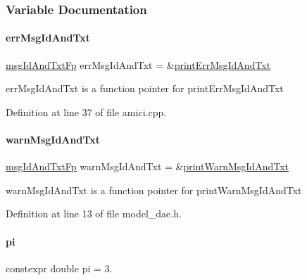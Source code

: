 \subsubsection{Variable Documentation}
\mbox{\label{namespaceamici_a19eefc037cc960b013cc0b724e5292b7}} 
\paragraph{\texorpdfstring{err\+Msg\+Id\+And\+Txt}{errMsgIdAndTxt}}
{\footnotesize\ttfamily \mbox{\hyperlink{namespaceamici_a02384ab9af881494db3ed32cd6ecdcc0}{msg\+Id\+And\+Txt\+Fp}} err\+Msg\+Id\+And\+Txt = \&\mbox{\hyperlink{namespaceamici_ade28c6a7f1b5aee40bb2453fb61b4024}{print\+Err\+Msg\+Id\+And\+Txt}}}

err\+Msg\+Id\+And\+Txt is a function pointer for print\+Err\+Msg\+Id\+And\+Txt 

Definition at line 37 of file amici.\+cpp.

\mbox{\label{namespaceamici_adb95b29229e987b4b0a55ade25961688}} 
\paragraph{\texorpdfstring{warn\+Msg\+Id\+And\+Txt}{warnMsgIdAndTxt}}
{\footnotesize\ttfamily \mbox{\hyperlink{namespaceamici_a02384ab9af881494db3ed32cd6ecdcc0}{msg\+Id\+And\+Txt\+Fp}} warn\+Msg\+Id\+And\+Txt = \&\mbox{\hyperlink{namespaceamici_a14122f73594a970df27bfcb8fa0db35d}{print\+Warn\+Msg\+Id\+And\+Txt}}}

warn\+Msg\+Id\+And\+Txt is a function pointer for print\+Warn\+Msg\+Id\+And\+Txt 

Definition at line 13 of file model\+\_\+dae.\+h.

\mbox{\label{namespaceamici_ad172e8d1a294401209781f9aeaa77410}} 
\paragraph{\texorpdfstring{pi}{pi}}
{\footnotesize\ttfamily constexpr double pi = 3.}

